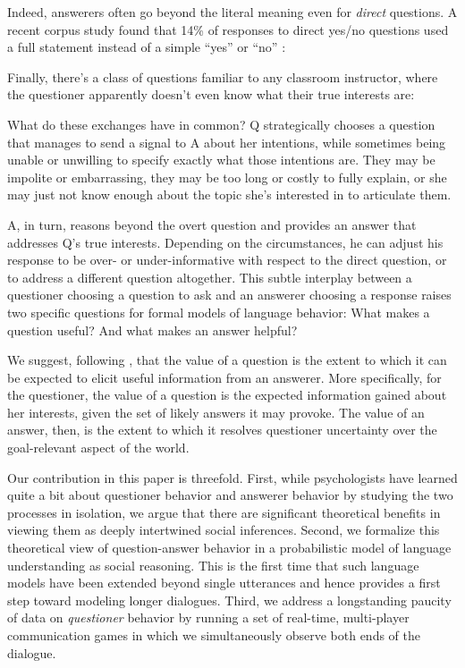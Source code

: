 \documentclass[12pt, floatsintext, jou]{apa6}
\begin{document}
Indeed, answerers often go beyond the literal meaning even for \emph{direct} questions. A recent corpus study found that 14\% of responses to direct yes/no questions used a full statement instead of a simple ``yes'' or ``no'' \cite{DeMarneffeGrimmPotts09_IndirectAnswersCorpus}:


Finally, there's a class of questions familiar to any classroom instructor, where the questioner apparently doesn't even know what their true interests are:


 What do these exchanges have in common? Q strategically chooses a question that manages to send a signal to A about her intentions, while sometimes being unable or unwilling to specify exactly what those intentions are. They may be impolite or embarrassing, they may be too long or costly to fully explain, or she may just not know enough about the topic she's interested in to articulate them.

A, in turn, reasons beyond the overt question and provides an answer that addresses Q's true interests. Depending on the circumstances, he can adjust his response to be over- or under-informative with respect to the direct question, or to address a different question altogether.  This subtle interplay between a questioner choosing a question to ask and an answerer choosing  a response raises two specific questions for formal models of language behavior: What makes a question useful? And what makes an answer helpful? 

We suggest, following , that the value of a question is the extent to which it can be expected to elicit useful information from an answerer. 
More specifically, for the questioner, the value of a question is the expected information gained about her interests, given the set of likely answers it may provoke. The value of an answer, then, is the extent to which it resolves questioner uncertainty over the goal-relevant aspect of the world. 

Our contribution in this paper is threefold. First, while psychologists have learned quite a bit about questioner behavior and answerer behavior by studying the two processes in isolation, we argue that there are significant theoretical benefits in viewing them as deeply intertwined social inferences. Second, we formalize this theoretical view of question-answer behavior in a probabilistic model of language understanding as social reasoning. This is the first time that such language models have been extended beyond single utterances and hence provides a first step toward modeling longer dialogues. Third, we address a longstanding paucity of data on \emph{questioner} behavior by running a set of real-time, multi-player communication games in which we simultaneously observe both ends of the dialogue. 
\end{document}
